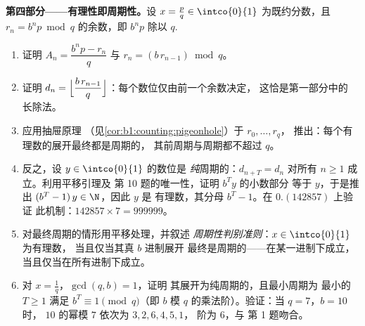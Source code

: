 \begin{problem}
\medskip
\noindent\textbf{第四部分——有理性即周期性。}设 $x
= \frac pq \in \intco{0}{1}$ 为既约分数，且 $r_n = b^n p
\bmod q$ 的余数，即 $b^n p$ 除以
$q$.
\begin{enumerate}[resume]
  \item 证明 $A_n = \dfrac{b^n p - r_n}{q}$ 与 $r_n =
        (b\,r_{n-1}) \bmod q$。
  \item 证明 $d_n = \Bigl\lfloor \dfrac{b\,r_{n-1}}{q}
        \Bigr\rfloor$：每个数位仅由前一个余数决定，
        这恰是第一部分中的
        长除法。
  \item 应用抽屉原理
        （见\cref{cor:b1:counting:pigeonhole}）于 $r_0, \dots, r_q$，
        推出：每个有理数的展开最终都是周期的，
        其前周期与周期都不超过
        $q$。
  \item 反之，设 $y \in \intco{0}{1}$ 的数位是
        \emph{纯}周期的：$d_{n+T} = d_n$ 对所有 $n
        \geq 1$ 成立。利用平移引理及
        第 10 题的唯一性，证明 $b^T y$ 的小数部分
        等于 $y$，于是推出 $(b^T - 1)\,y \in \N$，因此 $y$ 是
        有理数，其分母 $b^T - 1$。在 $0.(142857)$ 上验证
        此机制：$142857 \times 7 = 999999$。
  \item 对最终周期的情形用平移处理，并叙述
        \emph{周期性判别准则}：$x \in \intco{0}{1}$ 为有理数，
        当且仅当其真 $b$ 进制展开
        最终是周期的——在某一进制下成立，
        当且仅当在所有进制下成立。
  \item 对 $x = \frac 1q$，$\gcd(q, b) = 1$，证明
        其展开为纯周期的，且最小周期为
        最小的 $T \geq 1$ 满足 $b^T \equiv 1 \pmod q$（即
        $b$ 模 $q$ 的乘法阶）。验证：当 $q = 7$，$b = 10$ 时，
        $10$ 的幂模 $7$ 依次为 $3, 2, 6, 4, 5, 1$，
        阶为 $6$，与
        第 1 题吻合。
\end{enumerate}


\end{problem}
